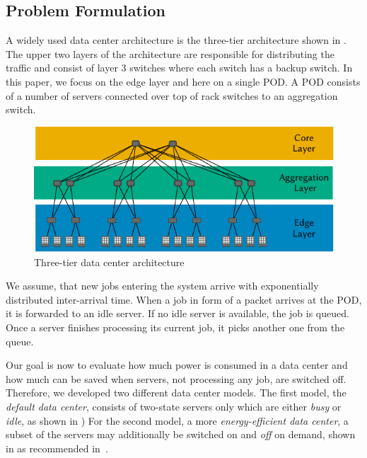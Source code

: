 \subsection{Problem Formulation}\label{sec:cloud:data_centers:problem_formulation}

A widely used data center architecture is the three-tier architecture shown in .
The upper two layers of the architecture are responsible for distributing the traffic and consist of layer 3 switches where each switch has a backup switch.
In this paper, we focus on the edge layer and here on a single \gls{POD}.
A \gls{POD} consists of a number of servers connected over top of rack switches to an aggregation switch.

\begin{figure}
  \centering
  \includegraphics{cloud/data_centers/problem_formulation/figures/architecture}
  \caption{Three-tier data center architecture}
  \label{fig:cloud:data_centers:problem_formulation:3-tier_datacenter}
\end{figure}


We assume, that new jobs entering the system arrive with exponentially distributed inter-arrival time.
When a job in form of a packet arrives at the \gls{POD}, it is forwarded to an idle server.
If no idle server is available, the job is queued.
Once a server finishes processing its current job, it picks another one from the queue.

Our goal is now to evaluate how much power is consumed in a data center and how much can be saved when servers, not processing any job, are switched off.
Therefore, we developed two different data center models.
The first model, the \emph{default data center}, consists of two-state servers only which are either \emph{busy} or \emph{idle}, as shown in ) 
For the second model, a more \emph{energy-efficient data center}, a subset of the servers may additionally be switched on and \emph{off} on demand, shown in  as recommended in~\cite{EPA2007}.

